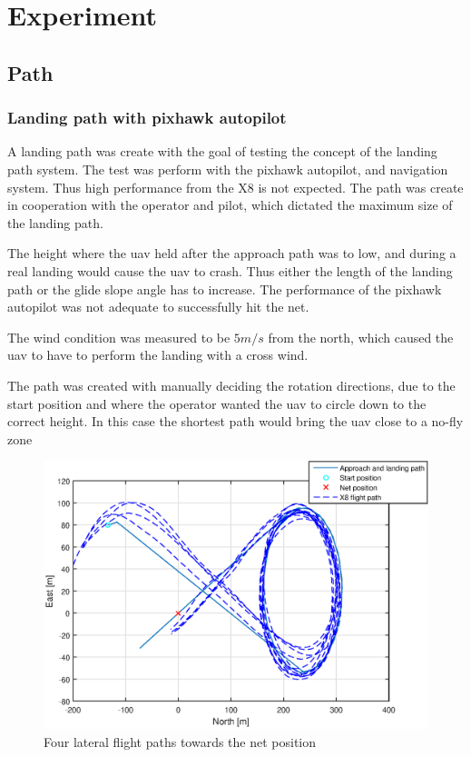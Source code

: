 \chapter{Experiment}
\section{Path}
\subsection{Landing path with pixhawk autopilot}
A landing path was create with the goal of testing the concept of the landing path system. The test was perform with the pixhawk autopilot, and navigation system. Thus high performance from the X8 is not expected. The path was create in cooperation with the operator and pilot, which dictated the maximum size of the landing path.

The height where the \gls{uav} held after the approach path was to low, and during a real landing would cause the \gls{uav} to crash. Thus either the length of the landing path or the glide slope angle has to increase. The performance of the pixhawk autopilot was not adequate to successfully hit the net.

The wind condition was measured to be $5m/s$ from the north, which caused the \gls{uav} to have to perform the landing with a cross wind.

The path was created with manually deciding the rotation directions, due to the start position and where the operator wanted the \gls{uav} to circle down to the correct height. In this case the shortest path would bring the \gls{uav} close to a no-fly zone


\begin{figure}[H]
	\centering
		\includegraphics[width=1\textwidth]{figs/Experiment/NorthEastLandingPathArdu.eps}
		\caption{Four lateral flight paths towards the net position}
		\label{Fig:NorthEastArdu}
\end{figure}
